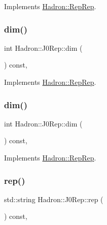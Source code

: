 Implements \mbox{\hyperlink{structHadron_1_1RepRep_a92c8802e5ed7afd7da43ccfd5b7cd92b}{Hadron\+::\+Rep\+Rep}}.

\mbox{\label{structHadron_1_1J0Rep_a99c9a3c8bac7e89e8f393fdd0cdd8c64}} 
\subsubsection{\texorpdfstring{dim()}{dim()}\hspace{0.1cm}{\footnotesize\ttfamily [2/3]}}
{\footnotesize\ttfamily int Hadron\+::\+J0\+Rep\+::dim (\begin{DoxyParamCaption}{ }\end{DoxyParamCaption}) const\hspace{0.3cm}{\ttfamily [inline]}, {\ttfamily [virtual]}}



Implements \mbox{\hyperlink{structHadron_1_1RepRep_a92c8802e5ed7afd7da43ccfd5b7cd92b}{Hadron\+::\+Rep\+Rep}}.

\mbox{\label{structHadron_1_1J0Rep_a99c9a3c8bac7e89e8f393fdd0cdd8c64}} 
\subsubsection{\texorpdfstring{dim()}{dim()}\hspace{0.1cm}{\footnotesize\ttfamily [3/3]}}
{\footnotesize\ttfamily int Hadron\+::\+J0\+Rep\+::dim (\begin{DoxyParamCaption}{ }\end{DoxyParamCaption}) const\hspace{0.3cm}{\ttfamily [inline]}, {\ttfamily [virtual]}}



Implements \mbox{\hyperlink{structHadron_1_1RepRep_a92c8802e5ed7afd7da43ccfd5b7cd92b}{Hadron\+::\+Rep\+Rep}}.

\mbox{\label{structHadron_1_1J0Rep_a357214188122dd0e69716a4f7ff098b1}} 
\subsubsection{\texorpdfstring{rep()}{rep()}\hspace{0.1cm}{\footnotesize\ttfamily [1/3]}}
{\footnotesize\ttfamily std\+::string Hadron\+::\+J0\+Rep\+::rep (\begin{DoxyParamCaption}{ }\end{DoxyParamCaption}) const\hspace{0.3cm}{\ttfamily [inline]}, {\ttfamily [virtual]}}



